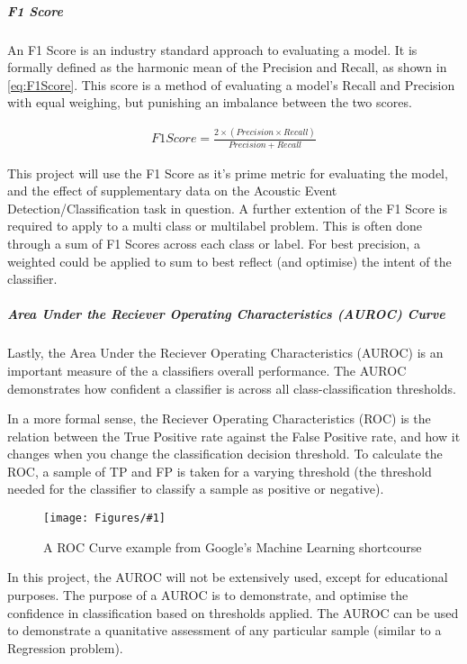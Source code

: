 \documentclass{UoNMCHA}
\newcommand{\fFigure}[3]{
	\begin{figure}[h]
        \begin{center}  
            \texttt{[image: Figures/\#1]}  
            \caption{#2}
            \label{#1}
        \end{center}
	\end{figure}
}
\numberwithin{equation}{section}
\begin{document}
\subparagraph{F1 Score}
An F1 Score is an industry standard approach to evaluating a model. It is formally defined as the harmonic mean of the Precision and Recall, as shown in \ref{eq:F1Score}. This score is a method of evaluating a model's Recall and Precision with equal weighing, but punishing an imbalance between the two scores. 

\begin{gather}\label{eq:F1Score}
    F1 Score = \frac{2 \times (Precision \times Recall)}{Precision + Recall}
\end{gather}

This project will use the F1 Score as it's prime metric for evaluating the model, and the effect of supplementary data on the Acoustic Event Detection/Classification task in question. A further extention of the F1 Score is required to apply to a multi class or multilabel problem. This is often done through a sum of F1 Scores across each class or label. For best precision, a weighted could be applied to sum to best reflect (and optimise) the intent of the classifier. 

\subparagraph{Area Under the Reciever Operating Characteristics (AUROC) Curve}
Lastly, the Area Under the Reciever Operating Characteristics (AUROC) is an important measure of the a classifiers overall performance. The AUROC demonstrates how confident a classifier is across all class-classification thresholds.

In a more formal sense, the Reciever Operating Characteristics (ROC) is the relation between the True Positive rate against the False Positive rate, and how it changes when you change the classification decision threshold. To calculate the ROC, a sample of TP and FP is taken for a varying threshold (the threshold needed for the classifier to classify a sample as positive or negative). 

\fFigure{ROCCurve.png}{A ROC Curve example from Google's Machine Learning shortcourse\cite{TF_ROC}}{0.5}

In this project, the AUROC will not be extensively used, except for educational purposes. The purpose of a AUROC is to demonstrate, and optimise the confidence in classification based on thresholds applied. The AUROC can be used to demonstrate a quanitative assessment of any particular sample (similar to a Regression problem).
\end{document}

